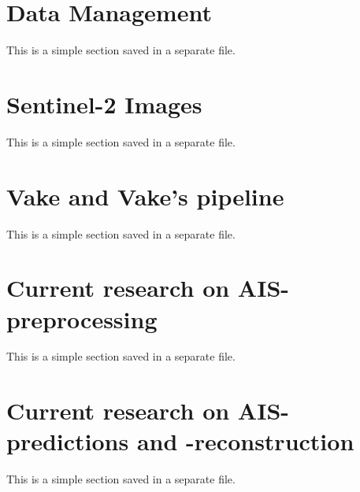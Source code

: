 




\section{Data Management}
\begin{info}{}
	This is a simple section saved in a separate file.
\end{info}



\section{Sentinel-2 Images}
\begin{info}{}
	This is a simple section saved in a separate file.
\end{info}




\section{Vake and Vake's pipeline}
\begin{info}{}
	This is a simple section saved in a separate file.
\end{info}





\section{Current research on AIS-preprocessing}
\begin{info}{}
	This is a simple section saved in a separate file.
\end{info}





\section{Current research on AIS-predictions and -reconstruction}
\begin{info}{}
	This is a simple section saved in a separate file.
\end{info}







